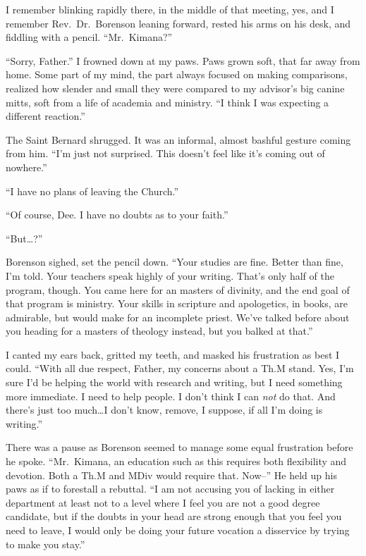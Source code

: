 I remember blinking rapidly there, in the middle of that meeting, yes, and I remember Rev.~Dr.~Borenson leaning forward, rested his arms on his desk, and fiddling with a pencil. ``Mr.~Kimana?''

``Sorry, Father.'' I frowned down at my paws. Paws grown soft, that far away from home. Some part of my mind, the part always focused on making comparisons, realized how slender and small they were compared to my advisor's big canine mitts, soft from a life of academia and ministry. ``I think I was expecting a different reaction.''

The Saint Bernard shrugged. It was an informal, almost bashful gesture coming from him. ``I'm just not surprised. This doesn't feel like it's coming out of nowhere.''

``I have no plans of leaving the Church.''

``Of course, Dee. I have no doubts as to your faith.''

``But\ldots?''

Borenson sighed, set the pencil down. ``Your studies are fine. Better than fine, I'm told. Your teachers speak highly of your writing. That's only half of the program, though. You came here for an masters of divinity, and the end goal of that program is ministry. Your skills in scripture and apologetics, in books, are admirable, but would make for an incomplete priest. We've talked before about you heading for a masters of theology instead, but you balked at that.''

I canted my ears back, gritted my teeth, and masked his frustration as best I could. ``With all due respect, Father, my concerns about a Th.M stand. Yes, I'm sure I'd be helping the world with research and writing, but I need something more immediate. I need to help people. I don't think I can \emph{not} do that. And there's just too much\ldots I don't know, remove, I suppose, if all I'm doing is writing.''

There was a pause as Borenson seemed to manage some equal frustration before he spoke. ``Mr.~Kimana, an education such as this requires both flexibility and devotion. Both a Th.M and MDiv would require that. Now--'' He held up his paws as if to forestall a rebuttal. ``I am not accusing you of lacking in either department at least not to a level where I feel you are not a good degree candidate, but if the doubts in your head are strong enough that you feel you need to leave, I would only be doing your future vocation a disservice by trying to make you stay.''

